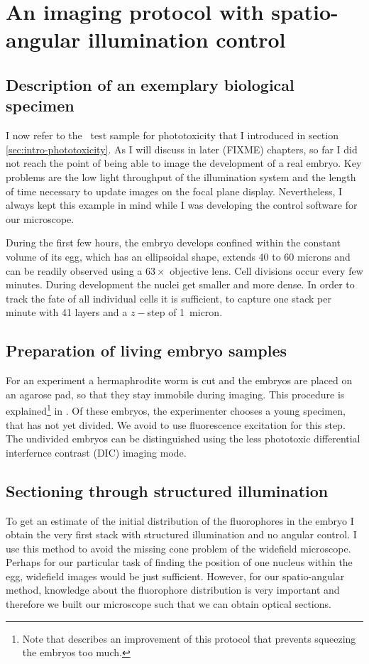 \section{An imaging protocol with spatio-angular illumination control}
\subsection{Description of an exemplary biological specimen} 
I now refer to the \celegans\ test sample for phototoxicity that I
introduced in section \ref{sec:intro-phototoxicity}. As I will discuss
in later (FIXME) chapters, so far I did not reach the point of being
able to image the development of a real embryo. Key problems are the
low light throughput of the illumination system and the length of time
necessary to update images on the focal plane display. Nevertheless, I
always kept this example in mind while I was developing the control
software for our microscope.

During the first few hours, the embryo develops confined within the
constant volume of its egg, which has an ellipsoidal shape, extends 40
to 60 microns and can be readily observed using a $63\times$ objective
lens. Cell divisions occur every few minutes.  During development the
nuclei get smaller and more dense. In order to track the fate of all
individual cells it is sufficient, to capture one stack per minute
with 41 layers and a $z-$step of 1~micron.
\subsection{Preparation of living embryo samples} 
For an experiment a hermaphrodite worm is cut and the embryos are
placed on an agarose pad, so that they stay immobile during
imaging. This procedure is explained\footnote{Note that
  \cite{Murray2006} describes an improvement of this protocol that
  prevents squeezing the embryos too much.} in \cite{Hope1999}. Of
these embryos, the experimenter chooses a young specimen, that has not
yet divided. We avoid to use fluorescence excitation for this step.
The undivided embryos can be distinguished using the less phototoxic
differential interfernce contrast (DIC) imaging mode.

\subsection{Sectioning through structured illumination} 
To get an estimate of the initial distribution of the fluorophores in
the embryo I obtain the very first stack with structured illumination
and no angular control. I use this method to avoid the missing cone
problem of the widefield microscope. Perhaps for our particular task
of finding the position of one nucleus within the egg, widefield
images would be just sufficient.  However, for our spatio-angular
method, knowledge about the fluorophore distribution is very important
and therefore we built our microscope such that we can obtain optical
sections.

